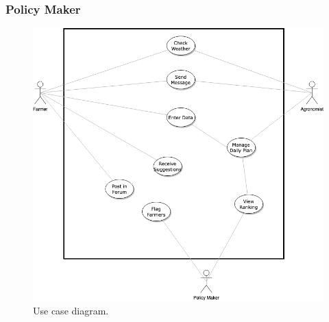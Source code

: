 















\newpage
\subsubsection{Policy Maker}
%












\begin{figure}[hbt!]
\centering
\includegraphics[scale=0.6]{../images_diagrams/usecasediagram.png}
\caption{\label{fig:usecase}Use case diagram.}
\end{figure}

